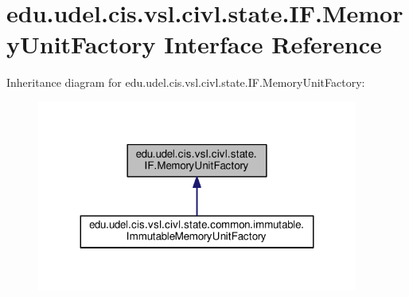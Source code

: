 \hypertarget{interfaceedu_1_1udel_1_1cis_1_1vsl_1_1civl_1_1state_1_1IF_1_1MemoryUnitFactory}{}\section{edu.\+udel.\+cis.\+vsl.\+civl.\+state.\+I\+F.\+Memory\+Unit\+Factory Interface Reference}
\label{interfaceedu_1_1udel_1_1cis_1_1vsl_1_1civl_1_1state_1_1IF_1_1MemoryUnitFactory}


Inheritance diagram for edu.\+udel.\+cis.\+vsl.\+civl.\+state.\+I\+F.\+Memory\+Unit\+Factory\+:
\nopagebreak
\begin{figure}[H]
\begin{center}
\leavevmode
\includegraphics[width=299pt]{interfaceedu_1_1udel_1_1cis_1_1vsl_1_1civl_1_1state_1_1IF_1_1MemoryUnitFactory__inherit__graph}
\end{center}
\end{figure}
